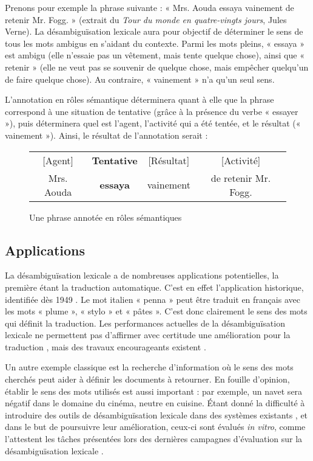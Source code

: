 Prenons pour exemple la phrase suivante : « Mrs. Aouda essaya vainement de
retenir Mr. Fogg. » (extrait du \textit{Tour du monde en quatre-vingts jours},
Jules Verne). La désambiguïsation lexicale aura pour objectif de déterminer le
sens de tous les mots ambigus en s'aidant du contexte. Parmi les mots pleins, «
essaya » est ambigu (elle n'essaie pas un vêtement, mais tente quelque chose),
ainsi que « retenir » (elle ne veut pas se souvenir de quelque chose, mais
empêcher quelqu'un de faire quelque chose). Au contraire, « vainement » n'a
qu'un seul sens.

L'annotation en rôles sémantique déterminera quant à elle que la phrase
correspond à une situation de tentative (grâce à la présence du verbe « essayer
»), puis déterminera quel est l'agent, l'activité qui a été tentée, et le
résultat (« vainement »). Ainsi, le résultat de l'annotation serait :

\begin{figure}[htbl]
    \centering
    \begin{tabular}{cccc}
      [Agent]  & \textbf{Tentative} & [Résultat]  & [Activité]           \tabularnewline
    Mrs. Aouda & \textbf{essaya}  & vainement  & de retenir Mr. Fogg. \tabularnewline
    \end{tabular}
    \caption{Une phrase annotée en rôles sémantiques}
\end{figure}

\subsection{Applications}

La désambiguïsation lexicale a de nombreuses applications potentielles, la
première étant la traduction automatique. C'est en effet l'application
historique, identifiée dès 1949 \citep{weaver1949translation}. Le mot italien «
penna » peut être traduit en français avec les mots « plume », « stylo » et «
pâtes ». C'est donc clairement le sens des mots qui définit la traduction. Les
performances actuelles de la désambiguïsation lexicale ne permettent pas
d'affirmer avec certitude une amélioration pour la traduction
\citep{apidianaki2009place}, mais des travaux encourageants existent
\citep{chan2007word}.

Un autre exemple classique est la recherche d'information où le sens des mots
cherchés peut aider à définir les documents à retourner. En fouille d'opinion,
établir le sens des mots utilisés est aussi important : par exemple, un navet
sera négatif dans le domaine du cinéma, neutre en cuisine. Étant donné la
difficulté à introduire des outils de désambiguïsation lexicale dans des
systèmes existants \citep{navigli2009word}, et dans le but de poursuivre leur
amélioration, ceux-ci sont évalués \textit{in vitro}, comme l'attestent les
tâches présentées lors des dernières campagnes d'évaluation sur la
désambiguïsation lexicale
\citep{agirre2010semeval,manandhar2010semeval,lefever2010semeval}.

